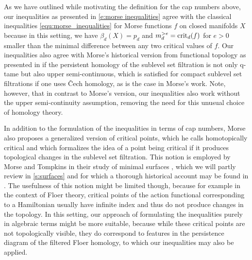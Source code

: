 As we have outlined while motivating the definition for the cap numbers above, our inequalities as presented in \eqref{e:morse inequalities} agree with the classical inequalities \eqref{equ:morse_inequalities} for Morse functions $f$ on closed manifolds $X$ because in this setting, we have $\beta_d(X) = p_d$ and $m_d^{>e} = \operatorname{crit}_d(f)$ for $e > 0$ smaller than the minimal difference between any two critical values of $f$. Our inequalities also agree with Morse's historical version from functional topology as presented in \cite{Morse.1940} if the persistent homology of the sublevel set filtration is not only q-tame but also upper semi-continuous, which is satisfied for compact sublevel set filtrations if one uses \v{C}ech homology, as is the case in Morse's work. Note, however, that in contrast to Morse's version, our inequalities also work without the upper semi-continuity assumption, removing the need for this unusual choice of homology theory.

\begin{rem}
In addition to the formulation of the inequalities in terms of cap numbers, Morse also proposes a generalized version of critical points, which he calls homotopically critical and which formalizes the idea of a point being critical if it produces topological changes in the sublevel set filtration. 
This notion is employed by Morse and Tompkins in their study of minimal surfaces \cite{Morse.1939}, which we will partly review in \cref{s:surfaces} and for which a thorough historical account may be found in \cite[Section II.6]{Struwe.1988}.
The usefulness of this notion might be limited though, because for example in the context of Floer theory, critical points of the action functional corresponding to a Hamiltonian usually have infinite index and thus do not produce changes in the topology. 
In this setting, our approach of formulating the inequalities purely in algebraic terms might be more suitable, because while these critical points are not topologically visible, they do correspond to features in the persistence diagram of the filtered Floer homology, to which our inequalities may also be applied.
\end{rem}




